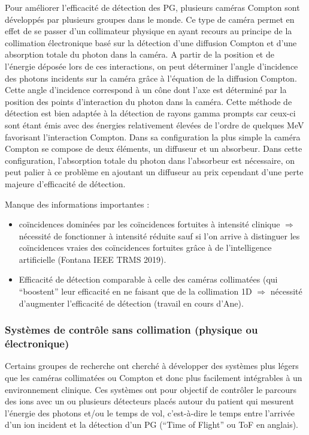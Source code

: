 \documentclass[11pt,a4paper,oldfontcommands]{memoir}
\begin{document}
Pour améliorer l'efficacité de détection des PG, plusieurs caméras Compton sont développés par plusieurs groupes dans le monde. Ce type de caméra permet en effet de se passer d'un collimateur physique en ayant recours au principe de la collimation électronique basé sur la détection d'une diffusion Compton et d'une absorption totale du photon dans la caméra. A partir de la position et de l'énergie déposée lors de ces interactions, on peut déterminer l'angle d'incidence des photons incidents sur la caméra grâce à l'équation de la diffusion Compton. Cette angle d'incidence correspond à un cône dont l'axe est déterminé par la position des points d'interaction du photon dans la caméra. Cette méthode de détection est bien adaptée à la détection de rayons gamma prompts car ceux-ci sont étant émis avec des énergies relativement élevées de l'ordre de quelques MeV favorisant l'interaction Compton. Dans sa configuration la plus simple la caméra Compton se compose de deux éléments, un diffuseur et un absorbeur. Dans cette configuration, l'absorption totale du photon dans l'absorbeur est nécessaire, on peut palier à ce problème en ajoutant un diffuseur au prix cependant d'une perte majeure d'efficacité de détection. 

Manque des informations importantes :  
\begin{itemize}
  \item coïncidences dominées par les coïncidences fortuites à intensité clinique $\Rightarrow$ nécessité de fonctionner à intensité réduite sauf si l'on arrive à distinguer les coïncidences vraies des coïncidences fortuites grâce à de l'intelligence artificielle (Fontana IEEE TRMS 2019). 
  \item Efficacité de détection comparable à celle des caméras collimatées (qui \enquote{boostent} leur efficacité en ne faisant que de la collimation 1D $\Rightarrow$ nécessité d'augmenter l'efficacité de détection (travail en cours d'Ane).
\end{itemize}




\subsubsection{Systèmes de contrôle sans collimation (physique ou électronique)}

Certains groupes de recherche ont cherché à développer des systèmes plus légers que les caméras collimatées ou Compton et donc plus facilement intégrables à un environnement clinique. Ces systèmes ont pour objectif de contrôler le parcours des ions avec un ou plusieurs détecteurs placés autour du patient qui mesurent l'énergie des photons et/ou le temps de vol, c'est-à-dire le temps entre l'arrivée d'un ion incident et la détection d'un  PG (\enquote{Time of Flight} ou ToF en anglais). 
\end{document}
